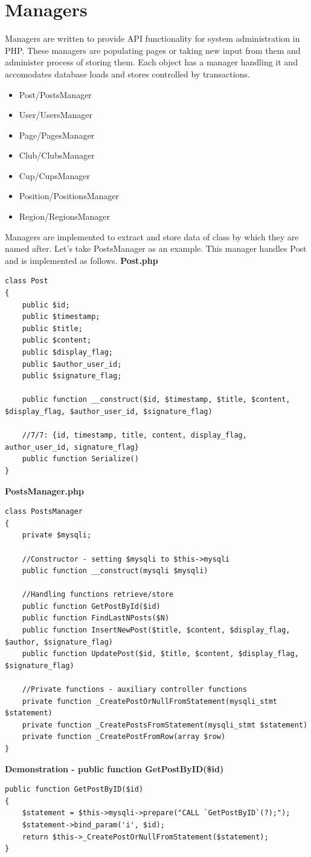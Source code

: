 \section{Managers}
Managers are written to provide API functionality for system administration in PHP. These managers are populating pages or taking new input from them and administer process of storing them. Each object has a manager handling it and accomodates database loads and stores controlled by transactions.
\begin{itemize}
    \item Post/PostsManager
    \item User/UsersManager
    \item Page/PagesManager
    \item Club/ClubsManager
    \item Cup/CupsManager
    \item Position/PositionsManager
    \item Region/RegionsManager
\end{itemize}
Managers are implemented to extract and store data of class by which they are named after. Let's take PostsManager as an example. This manager handles Post and is implemented as follows.
\newline
\textbf{Post.php}
\begin{lstlisting}
class Post
{
    public $id;
    public $timestamp;
    public $title;
    public $content;
    public $display_flag;
    public $author_user_id;
	public $signature_flag;

    public function __construct($id, $timestamp, $title, $content, $display_flag, $author_user_id, $signature_flag)

	//7/7: {id, timestamp, title, content, display_flag, author_user_id, signature_flag}
	public function Serialize()
}

\end{lstlisting}
\textbf{PostsManager.php} 
\begin{lstlisting}
class PostsManager
{
	private $mysqli;

    //Constructor - setting $mysqli to $this->mysqli
	public function __construct(mysqli $mysqli)

    //Handling functions retrieve/store  
	public function GetPostById($id)
  	public function FindLastNPosts($N)
	public function InsertNewPost($title, $content, $display_flag, $author, $signature_flag)
    public function UpdatePost($id, $title, $content, $display_flag, $signature_flag)

    //Private functions - auxiliary controller functions
	private function _CreatePostOrNullFromStatement(mysqli_stmt $statement)
	private function _CreatePostsFromStatement(mysqli_stmt $statement)
	private function _CreatePostFromRow(array $row)
}
\end{lstlisting}
\textbf{Demonstration - public function GetPostByID(\$id)}
\begin{lstlisting}
public function GetPostByID($id)
{
	$statement = $this->mysqli->prepare("CALL `GetPostByID`(?);");
	$statement->bind_param('i', $id);
	return $this->_CreatePostOrNullFromStatement($statement);
}
\end{lstlisting}
